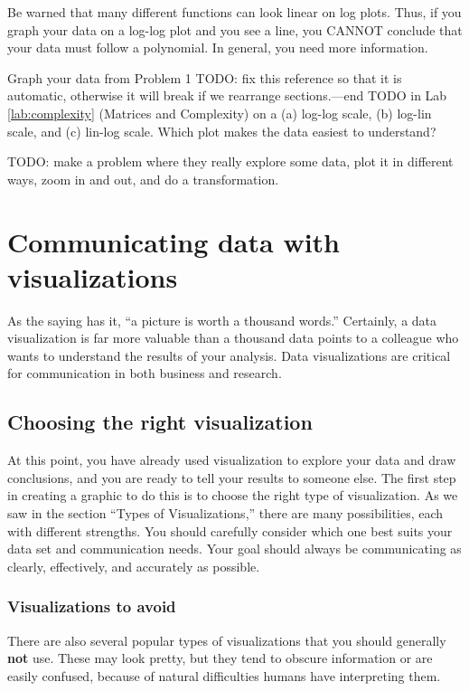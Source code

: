Be warned that many different functions can look linear on log plots. 
Thus, if you graph your data on a log-log plot and you see a line, you CANNOT conclude that your data must follow a polynomial. 
In general, you need more information.


\begin{problem}
Graph your data from Problem 1
TODO: fix this reference so that it is automatic, otherwise it will break if we rearrange sections.---end TODO
 in Lab \ref{lab:complexity} (Matrices and Complexity) on a (a) log-log scale, (b) log-lin scale, and (c) lin-log scale. 
Which plot makes the data easiest to understand?
\end{problem}


\begin{problem}

TODO: make a problem where they really explore some data, plot it in different ways, zoom in and out, and do a transformation.

\end{problem}



\section*{Communicating data with visualizations}

As the saying has it, ``a picture is worth a thousand words.'' 
Certainly, a data visualization is far more valuable than a thousand data points to a colleague who wants to understand the results of your analysis. 
Data visualizations are critical for communication in both business and research.

\subsection*{Choosing the right visualization}
At this point, you have already used visualization to explore your data and draw conclusions, and you are ready to tell your results to someone else. 
The first step in creating a graphic to do this is to choose the right type of visualization. 
As we saw in the section ``Types of Visualizations,'' there are many possibilities, each with different strengths. 
You should carefully consider which one best suits your data set and communication needs.  Your goal should always be communicating as clearly, effectively, and accurately as possible.  

\subsubsection*{Visualizations to avoid}
There are also several popular types of visualizations that you should generally \textbf{not} use.  These may look pretty, but they tend to obscure information or are easily confused, because of natural difficulties humans have interpreting them.

